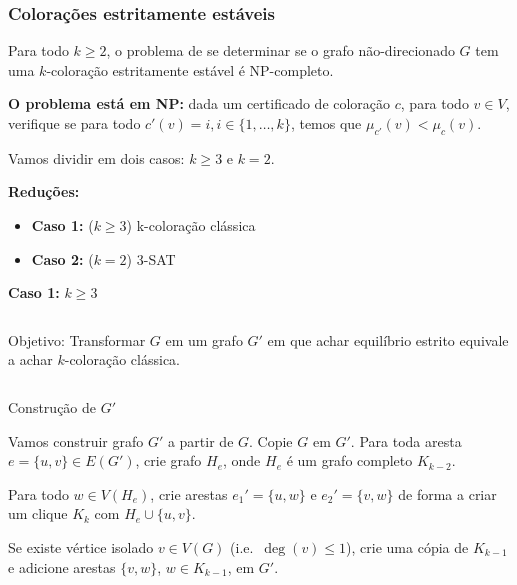 \documentclass{beamer}
\theoremstyle{plain}
\begin{document}
\begin{frame}
  \frametitle{Colorações estritamente estáveis}
  \begin{theorem}
    Para todo $k\geq 2$, o problema de se determinar se o grafo não-direcionado $G$ tem uma
    $k$-coloração estritamente estável é NP-completo.
  \end{theorem}
\end{frame}

\begin{frame}
  \textbf{O problema está em NP\@:} dada um certificado de coloração $c$, para todo $v\in V$, verifique se
  para todo $c'(v)=i,i\in\{1,\ldots,k\}$, temos que $\mu_{c'}(v)<\mu_c(v)$.

  Vamos dividir em dois casos: $k\geq 3$ e $k=2$.

  \textbf{Reduções:}
  \begin{itemize}
    \item \textbf{Caso 1:} ($k\geq 3$) k-coloração clássica
    \item \textbf{Caso 2:} ($k=2$) 3-SAT
  \end{itemize}
\end{frame}

\begin{frame}
  \large\textbf{Caso 1:} $k\geq 3$

  \normalsize
  \begin{columns}[t]
    \begin{column}{0.9\textwidth}
      \begin{block}{Objetivo:}
        Transformar $G$ em um grafo $G'$ em que achar equilíbrio estrito equivale a achar
        $k$-coloração clássica.
      \end{block}
    \end{column}
  \end{columns}
  \vspace{0.2in}

  {\color{blue} Construção de $G'$}

  Vamos construir grafo $G'$ a partir de $G$. Copie $G$ em $G'$. Para toda aresta $e=\{u,v\}\in
  E(G')$, crie grafo $H_e$, onde $H_e$ é um grafo completo $K_{k-2}$.

  Para todo $w\in V(H_e)$, crie arestas $e_1'=\{u,w\}$ e $e_2'=\{v,w\}$ de forma a criar um clique
  $K_k$ com $H_e\cup\{u,v\}$.

  Se existe vértice isolado $v\in V(G)$ (i.e.\ $\deg(v)\leq 1$), crie uma cópia de $K_{k-1}$ e
  adicione arestas $\{v,w\}$, $w\in K_{k-1}$, em $G'$.
\end{frame}
\end{document}
